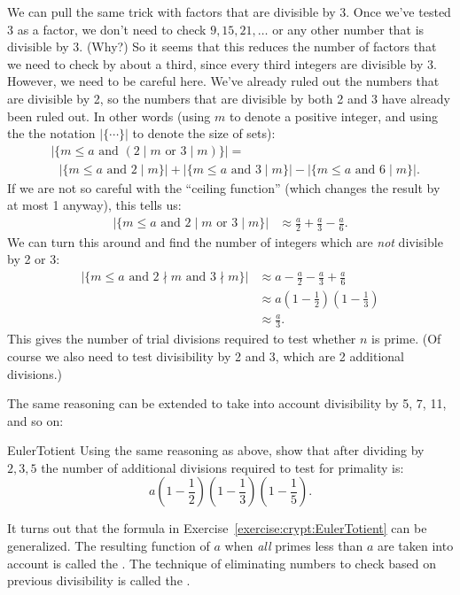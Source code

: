 We can pull the same trick with factors that are divisible by 3.  Once we've tested 3 as a factor, we don't need to check $9, 15, 21, \ldots$ or any other number that is divisible by 3.  (Why?)  So it seems that this reduces the number of factors that we need to check by about a third, since every third integers are divisible by 3. However, we need to be careful here. We've already ruled out the numbers that are divisible by 2, so the numbers that are divisible by both 2 and 3 have already been ruled out. In other words (using $m$ to denote a positive integer, and using the the notation $| \{ \cdots \} |$ to denote the size of sets):
\begin{align*}
&| \{ m \le a \text{ and } (2 \mid m \text{ or } 3 \mid m) \}| =\\ 
&~~~| \{ m \le a  \text{ and } 2 \mid m \}| + | \{ m \le a  \text{ and } 3 \mid m \}| - | \{ m \le a  \text{ and } 6 \mid m \}|.
\end{align*}
If we are not so careful with the ``ceiling function'' (which changes the result by at most 1 anyway), this tells us:
\begin{align*}
| \{ m \le a \text{ and } 2 \mid m \text{ or } 3 \mid m \}| &\approx 
\frac{a}{2} + \frac{a}{3} -\frac{a}{6}.
\end{align*}
We can turn this around and find the number of integers which are \emph{not} divisible by 2 or 3:
\begin{align*}
| \{ m \le a \text{ and } 2 \nmid m \text{ and } 3 \nmid m \}| &\approx 
a - \frac{a}{2} - \frac{a}{3} + \frac{a}{6} \\
&\approx a\left(1 - \frac{1}{2}\right) \left(1 - \frac{1}{3}\right)\\
&\approx \frac{a}{3}.
\end{align*}
This gives the number of trial divisions required to test whether $n$ is prime. (Of course we also need to test divisibility by 2 and 3, which are 2 additional divisions.)

The same reasoning can be extended to take into account divisibility by 5, 7, 11, and so on:

\begin{exercise}{EulerTotient}
Using the same reasoning as above, show that after dividing by $2,3,5$ the number of additional divisions required to test for primality is:
$$a\left(1 - \frac{1}{2}\right) \left(1 - \frac{1}{3}\right)\left( 1 - \frac{1}{5} \right).$$
\end{exercise}

It turns out that the formula in Exercise~\ref{exercise:crypt:EulerTotient} can be generalized. The resulting function of $a$ when \emph{all} primes less than $a$ are taken into account is called the . 
The technique of eliminating numbers to check based on previous divisibility is called the .


